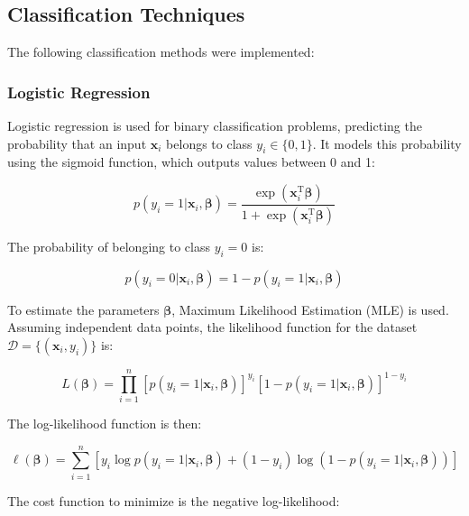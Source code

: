 \subsection{Classification Techniques}

The following classification methods were implemented:


\subsubsection{Logistic Regression}

Logistic regression is used for binary classification problems, predicting the probability that an input $\boldsymbol{x}_i$ belongs to class $y_i \in \{0, 1\}$. It models this probability using the sigmoid function, which outputs values between 0 and 1:

\begin{equation}
    p(y_i = 1 \vert \boldsymbol{x}_i, \boldsymbol{\beta}) = \frac{\exp(\boldsymbol{x}_i^\mathrm{T} \boldsymbol{\beta})}{1 + \exp(\boldsymbol{x}_i^\mathrm{T} \boldsymbol{\beta})}
\end{equation}

The probability of belonging to class $y_i = 0$ is:

\begin{equation}
    p(y_i = 0 \vert \boldsymbol{x}_i, \boldsymbol{\beta}) = 1 - p(y_i = 1 \vert \boldsymbol{x}_i, \boldsymbol{\beta})
\end{equation}

To estimate the parameters $\boldsymbol{\beta}$, Maximum Likelihood Estimation (MLE) is used. Assuming independent data points, the likelihood function for the dataset $\mathcal{D} = \{ (\boldsymbol{x}_i, y_i) \}$ is:

\begin{equation}
    L(\boldsymbol{\beta}) = \prod_{i=1}^n [p(y_i = 1 \vert \boldsymbol{x}_i, \boldsymbol{\beta})]^{y_i} [1 - p(y_i = 1 \vert \boldsymbol{x}_i, \boldsymbol{\beta})]^{1 - y_i}
\end{equation}

The log-likelihood function is then:

\begin{equation}
    \ell(\boldsymbol{\beta}) = \sum_{i=1}^n \left[ y_i \log p(y_i = 1 \vert \boldsymbol{x}_i, \boldsymbol{\beta}) + (1 - y_i) \log \left( 1 - p(y_i = 1 \vert \boldsymbol{x}_i, \boldsymbol{\beta}) \right) \right]
\end{equation}

The cost function to minimize is the negative log-likelihood:

